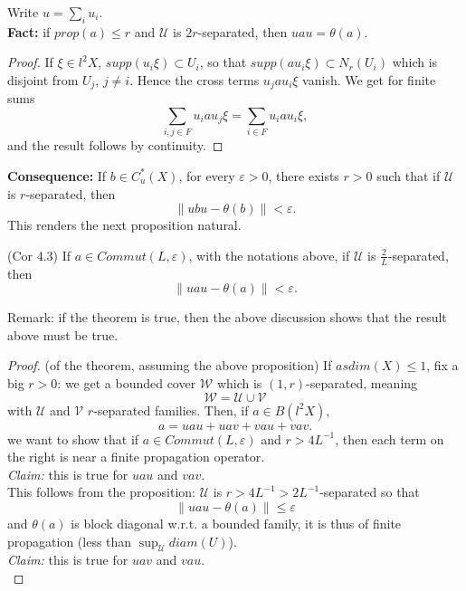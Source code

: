 Write $u=\sum_i u_i$. \\

\textbf{Fact:} if $prop(a)\leq r$ and $\mathcal U$ is $2r$-separated, then $uau=\theta(a)$.

\begin{proof}
If $\xi \in l^2 X$, $supp(u_i\xi)\subset U_i$, so that $supp(a u_i \xi ) \subset N_r(U_i)$ which is disjoint from $U_j$, $j\neq i$. Hence the cross terms $u_j a u_i \xi$ vanish. We get for finite sums \[\sum_{i,j \in F} u_i a u_j \xi =\sum_{i\in F} u_i a u_i \xi,\]
and the result follows by continuity. 
\end{proof}

\textbf{Consequence:} If $b\in C^*_u(X)$, for every $\varepsilon >0$, there exists $r>0$ such that if $\mathcal U$ is $r$-separated, then 
\[\| ubu -\theta(b)\| <\varepsilon.\]
This renders the next proposition natural.
\begin{prop}(Cor 4.3) 
If $a\in Commut(L,\varepsilon)$, with the notations above, if $\mathcal U $ is $\frac{2}{L}$-separated, then 
\[\| uau -\theta(a)\| <\varepsilon.\]
\end{prop}

Remark: if the theorem is true, then the above discussion shows that the result above must be true.\\

\begin{proof}(of the theorem, assuming the above proposition)
If $asdim(X)\leq 1$, fix a big $r>0$: we get a bounded cover $\mathcal W$ which is $(1,r)$-separated, meaning
\[\mathcal W = \mathcal U \cup \mathcal V\]
with $\mathcal U$ and $\mathcal V$ $r$-separated families. Then, if $a\in B(l^2X)$,
\[a = uau + uav + vau + vav.\]
we want to show that if $a\in Commut (L,\varepsilon)$ and $r>4L^{-1}$, then each term on the right is near a finite propagation operator. \\

\textit{Claim:} this is true for $uau$ and $vav$. \\

This follows from the proposition: $\mathcal U$ is $r>4L^{-1}> 2L^{-1}$-separated so that
\[ \| uau -\theta(a) \| \leq \varepsilon \]
and $\theta(a)$ is block diagonal w.r.t. a bounded family, it is thus of finite propagation (less than $\sup_{\mathcal U} diam (U)$).\\

\textit{Claim:} this is true for $uav$ and $vau$.\\


\end{proof}
 
